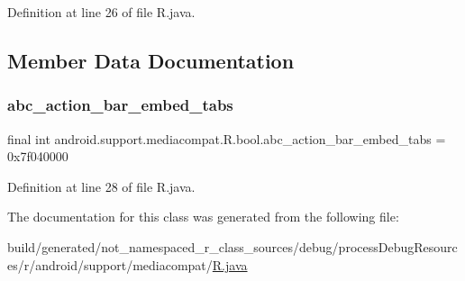 Definition at line 26 of file R.\+java.


\begin{DoxyCode}{0}

\end{DoxyCode}


\subsection{Member Data Documentation}
\mbox{\label{classandroid_1_1support_1_1mediacompat_1_1_r_1_1bool_abb24c449546205df61a1fd3372dcaae9}} 
\subsubsection{\texorpdfstring{abc\_action\_bar\_embed\_tabs}{abc\_action\_bar\_embed\_tabs}}
{\footnotesize\ttfamily final int android.\+support.\+mediacompat.\+R.\+bool.\+abc\+\_\+action\+\_\+bar\+\_\+embed\+\_\+tabs = 0x7f040000\hspace{0.3cm}{\ttfamily [static]}}



Definition at line 28 of file R.\+java.



The documentation for this class was generated from the following file\+:\begin{DoxyCompactItemize}
\item 
build/generated/not\+\_\+namespaced\+\_\+r\+\_\+class\+\_\+sources/debug/process\+Debug\+Resources/r/android/support/mediacompat/\mbox{\hyperlink{android_2support_2mediacompat_2_r_8java}{R.\+java}}\end{DoxyCompactItemize}
